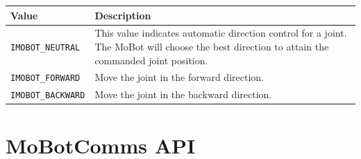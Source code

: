 \documentclass{article}
\begin{document}
\begin{tabular}{p{3cm}p{7cm}} \hline 
Value & Description \\
\hline 
\texttt{IMOBOT\_NEUTRAL} & This value indicates automatic direction control for a joint. 
The MoBot will choose the best direction to attain the commanded joint position. \\
\texttt{IMOBOT\_FORWARD} & Move the joint in the forward direction. \\
\texttt{IMOBOT\_BACKWARD} & Move the joint in the backward direction. \\
\end{tabular}

\section{MoBotComms API}


\printindex
\end{document}
